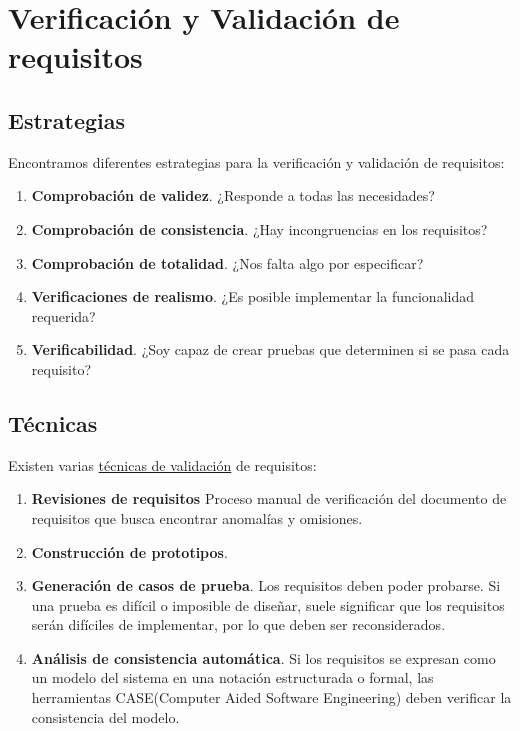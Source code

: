 \section{Verificación y Validación de requisitos}
\subsection{Estrategias}
Encontramos diferentes estrategias para la verificación y validación de requisitos:
\begin{enumerate}
    \item \textbf{Comprobación de validez}. ¿Responde a todas las necesidades?
    \item \textbf{Comprobación de consistencia}. ¿Hay incongruencias en los requisitos? %
    \item \textbf{Comprobación de totalidad}. ¿Nos falta algo por especificar? 
    \item \textbf{Verificaciones de realismo}. ¿Es posible implementar la funcionalidad requerida?
    \item \textbf{Verificabilidad}. ¿Soy capaz de crear pruebas que determinen si se pasa cada requisito?
\end{enumerate}

\subsection{Técnicas}
Existen varias \uline{técnicas de validación} de requisitos:

\begin{enumerate}
    \item \textbf{Revisiones de requisitos} Proceso manual de verificación del documento de requisitos que busca encontrar anomalías y omisiones.%
    \item \textbf{Construcción de prototipos}. %
    \item \textbf{Generación de casos de prueba}. Los requisitos deben poder probarse. Si una prueba es difícil o imposible de diseñar, suele significar que los requisitos serán difíciles de implementar, por lo que deben ser reconsiderados.
    \item \textbf{Análisis de consistencia automática}. Si los requisitos se expresan como un modelo del sistema en una notación estructurada o formal, las herramientas CASE(Computer Aided Software Engineering) deben verificar la consistencia del modelo.
\end{enumerate}
